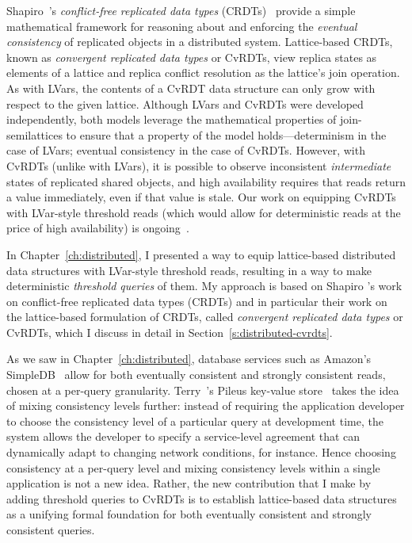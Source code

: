 Shapiro~\etal's \emph{conflict-free replicated data types}
(CRDTs)~\cite{crdts,crdts-tr} provide a simple mathematical framework
for reasoning about and enforcing the \emph{eventual consistency} of
replicated objects in a distributed system.  Lattice-based CRDTs,
known as \emph{convergent replicated data types} or CvRDTs, view
replica states as elements of a lattice and replica conflict
resolution as the lattice's join operation.  As with LVars, the
contents of a CvRDT data structure can only grow with respect to the
given lattice.  Although LVars and CvRDTs were developed
independently, both models leverage the mathematical properties of
join-semilattices to ensure that a property of the model
holds---determinism in the case of LVars; eventual consistency in the
case of CvRDTs.  However, with CvRDTs (unlike with LVars), it is
possible to observe inconsistent \emph{intermediate} states of
replicated shared objects, and high availability requires that reads
return a value immediately, even if that value is stale.  Our work on
equipping CvRDTs with LVar-style threshold reads (which would allow
for deterministic reads at the price of high availability) is
ongoing~\cite{joining-wodet}.  \fi

\ifdefined\DISSSERTATION
In Chapter~\ref{ch:distributed}, I presented a way to equip
lattice-based distributed data structures with LVar-style threshold
reads, resulting in a way to make deterministic \emph{threshold
  queries} of them.  My approach is based on Shapiro \etal's work on
conflict-free replicated data types (CRDTs) \cite{crdts,crdts-tr} and
in particular their work on the lattice-based formulation of CRDTs,
called \emph{convergent replicated data types} or CvRDTs, which I
discuss in detail in Section~\ref{s:distributed-cvrdts}.

As we saw in Chapter~\ref{ch:distributed}, database services such as
Amazon's SimpleDB~\cite{simpledb-vogels-article} allow for both
eventually consistent and strongly consistent reads, chosen at a
per-query granularity.  Terry~\etal's Pileus key-value
store~\cite{pileus} takes the idea of mixing consistency levels
further: instead of requiring the application developer to choose the
consistency level of a particular query at development time, the
system allows the developer to specify a service-level agreement that
can dynamically adapt to changing network conditions, for instance.
Hence choosing consistency at a per-query level and mixing consistency
levels within a single application is not a new idea.  Rather, the new
contribution that I make by adding threshold queries to CvRDTs is to
establish lattice-based data structures as a unifying formal
foundation for both eventually consistent and strongly consistent
queries.
\fi

